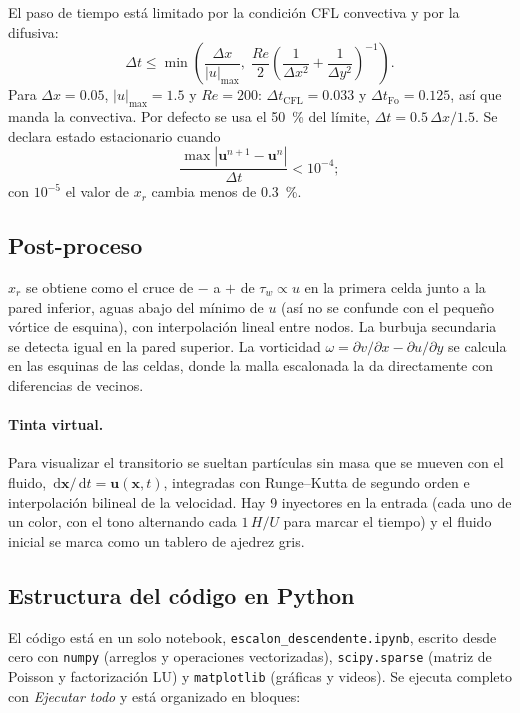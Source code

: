 \documentclass[11pt,letterpaper]{article}
\newcommand{\vu}{\mathbf{u}}
\newcommand{\Rey}{\mathit{Re}}
\newcommand{\dd}{\,\mathrm{d}}
\begin{document}
El paso de tiempo está limitado por la condición CFL convectiva y por la difusiva:
\begin{equation}
\Delta t\le\min\left(\frac{\Delta x}{|u|_{\max}},\;\frac{\Rey}{2}\left(\frac{1}{\Delta x^2}+\frac{1}{\Delta y^2}\right)^{-1}\right).
\end{equation}
Para $\Delta x=0.05$, $|u|_{\max}=1.5$ y $\Rey=200$: $\Delta t_{\text{CFL}}=0.033$ y $\Delta t_{\text{Fo}}=0.125$, así que
manda la convectiva. Por defecto se usa el \SI{50}{\percent} del límite, $\Delta t=0.5\,\Delta x/1.5$. Se declara estado
estacionario cuando
\begin{equation}
\frac{\max|\vu^{n+1}-\vu^n|}{\Delta t}<10^{-4};
\end{equation}
con $10^{-5}$ el valor de $x_r$ cambia menos de \SI{0.3}{\percent}.

\subsection{Post-proceso}

$x_r$ se obtiene como el cruce de $-$ a $+$ de $\tau_w\propto u$ en la primera celda junto a la pared inferior, aguas
abajo del mínimo de $u$ (así no se confunde con el pequeño vórtice de esquina), con interpolación lineal entre nodos. La
burbuja secundaria se detecta igual en la pared superior. La vorticidad $\omega=\partial v/\partial x-\partial u/\partial y$
se calcula en las esquinas de las celdas, donde la malla escalonada la da directamente con diferencias de vecinos.

\paragraph{Tinta virtual.} Para visualizar el transitorio se sueltan partículas sin masa que se mueven con el fluido,
$\dd\mathbf x/\dd t=\vu(\mathbf x,t)$, integradas con Runge–Kutta de segundo orden e interpolación bilineal de la
velocidad. Hay 9 inyectores en la entrada (cada uno de un color, con el tono alternando cada $1\,H/U$ para marcar el
tiempo) y el fluido inicial se marca como un tablero de ajedrez gris.

\subsection{Estructura del código en Python}\label{sec:codigo}

El código está en un solo notebook, \texttt{escalon\_descendente.ipynb}, escrito desde cero con \texttt{numpy} (arreglos
y operaciones vectorizadas), \texttt{scipy.sparse} (matriz de Poisson y factorización LU) y \texttt{matplotlib}
(gráficas y videos). Se ejecuta completo con \emph{Ejecutar todo} y está organizado en bloques:
\end{document}
